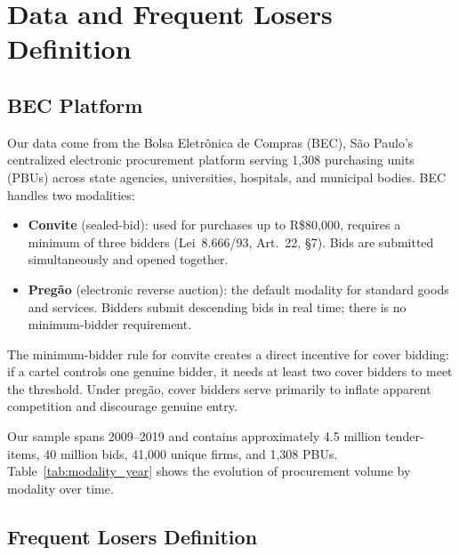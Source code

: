 
\section{Data and Frequent Losers Definition}
\label{sec:data}

\subsection{BEC Platform}
\label{sec:bec}

Our data come from the Bolsa Eletr\^onica de Compras (BEC), S\~ao
Paulo's centralized electronic procurement platform serving 1,308
purchasing units (PBUs) across state agencies, universities, hospitals,
and municipal bodies. BEC handles two modalities:

\begin{itemize}
  \item \textbf{Convite} (sealed-bid): used for purchases up to
    R\$80,000, requires a minimum of three bidders (Lei~8.666/93,
    Art.~22, \S7). Bids are submitted simultaneously and opened together.
  \item \textbf{Preg\~ao} (electronic reverse auction): the default
    modality for standard goods and services. Bidders submit descending
    bids in real time; there is no minimum-bidder requirement.
\end{itemize}

The minimum-bidder rule for convite creates a direct incentive for cover
bidding: if a cartel controls one genuine bidder, it needs at least two
cover bidders to meet the threshold. Under preg\~ao, cover bidders serve
primarily to inflate apparent competition and discourage genuine entry.

Our sample spans 2009--2019 and contains approximately 4.5 million
tender-items, 40 million bids, 41,000 unique firms, and 1,308 PBUs.
Table~\ref{tab:modality_year} shows the evolution of procurement volume
by modality over time.



\subsection{Frequent Losers Definition}
\label{sec:fl_definition}

